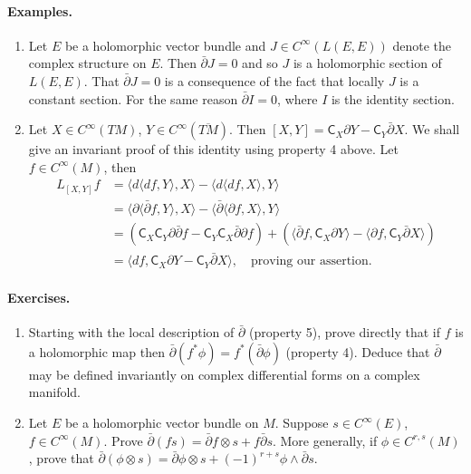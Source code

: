 \paragraph{Examples.}
\begin{enumerate}[start=2]
\item Let $E$ be a holomorphic vector bundle and $J\in C^\infty(L(E,E))$ denote the complex structure on $E$. Then $\bar\partial J=0$ and so $J$ is a holomorphic section of $L(E,E)$. That $\bar\partial J=0$ is a consequence of the fact that locally $J$ is a constant section. For the same reason $\bar\partial I=0$, where $I$ is the identity section.
\item Let $X\in C^\infty(TM)$, $Y\in C^\infty(\overline{TM})$. Then $[X,Y]=\mathsf C_X\partial Y-\mathsf C_Y\bar\partial X$. We shall give an invariant proof of this identity using property 4 above. Let $f\in C^\infty(M)$, then
\[
\begin{split}
L_{[X,Y]}f&=\langle d\langle df,Y\rangle,X\rangle-\langle d\langle df,X\rangle,Y\rangle\\
&=\langle\partial\langle\bar\partial f,Y\rangle,X\rangle-\langle\bar\partial\langle\partial f,X\rangle,Y\rangle\\
&=(\mathsf C_X\mathsf C_Y\partial\bar\partial f-\mathsf C_Y\mathsf C_X\bar\partial\partial f)+(\langle\bar\partial f,\mathsf C_X\partial Y\rangle-\langle\partial f,\mathsf C_Y\bar\partial X\rangle)\\
&=\langle df,\mathsf C_X\partial Y-\mathsf C_Y\bar\partial X\rangle,\quad\text{proving our assertion.}
\end{split}
\]
\end{enumerate}
\paragraph{Exercises.}
\begin{enumerate}
\item Starting with the local description of $\bar\partial$ (property 5), prove directly that if $f$ is a holomorphic map then $\bar\partial(f^*\phi)=f^*(\bar\partial\phi)$ (property 4).
Deduce that $\bar\partial$ may be defined invariantly on complex differential forms on a complex manifold.
\item Let $E$ be a holomorphic vector bundle on $M$. Suppose $s\in C^\infty(E)$, $f\in C^\infty(M)$. Prove $\bar\partial(fs)=\bar\partial f\otimes s+f\bar\partial s$. More generally, if $\phi\in C^{r,s}(M)$, prove that $\bar\partial(\phi\otimes s)=\bar\partial\phi\otimes s+(-1)^{r+s}\phi\wedge\bar\partial s$.
\end{enumerate}
